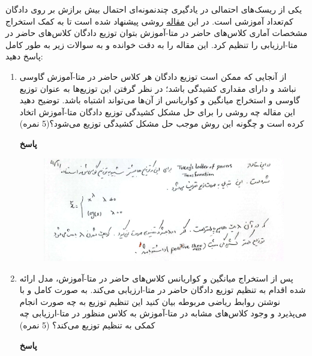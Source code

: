 \documentclass{article}
\begin{document}
یکی از ریسک‌های احتمالی در یادگیری چندنمونه‌ای احتمال بیش برازش 
بر روی دادگان کم‌تعداد آموزشی است. در این
\href{https://arxiv.org/abs/2101.06395}{مقاله}
روشی پیشنهاد شده است تا به کمک استخراج مشخصات آماری کلاس‌های حاضر در متا-آموزش بتوان توزیع دادگان کلاس‌های حاضر در متا-ارزیابی را تنظیم کرد. این مقاله را به دقت خوانده و به سوالات زیر به طور کامل پاسخ دهید:

\begin{enumerate}

\item
از آنجایی که ممکن است توزیع دادگان هر کلاس حاضر در متا-آموزش گاوسی نباشد و دارای مقداری کشیدگی باشد؛ در نظر گرفتن این توزیع‌ها به عنوان توزیع گاوسی و استخراج میانگین و کواریانس از آن‌ها می‌تواند اشتباه باشد. توضیح دهید این مقاله چه روشی را برای حل مشکل کشیدگی توزیع دادگان متا-آموزش اتخاد کرده است و چگونه این روش موجب حل مشکل کشیدگی توزیع می‌شود؟(5 نمره)


\textbf{پاسخ}

\begin{figure}[H]

\includegraphics[scale=0.6]{images/S4-1.png} 
\centering
\end{figure}

\item
پس از استخراج میانگین و کواریانس کلاس‌های حاضر در متا-آموزش، مدل ارائه شده اقدام به تنظیم توزیع دادگان حاضر در متا-ارزیابی می‌کند. به صورت کامل و با نوشتن روابط ریاضی مربوطه بیان کنید این تنظیم توزیع به چه صورت انجام می‌پذیرد و وجود کلاس‌های مشابه در متا-آموزش به کلاس منظور در متا-ارزیابی چه کمکی به تنظیم توزیع می‌کند؟ (5 نمره)

\textbf{پاسخ}


\end{enumerate}
\end{document}
